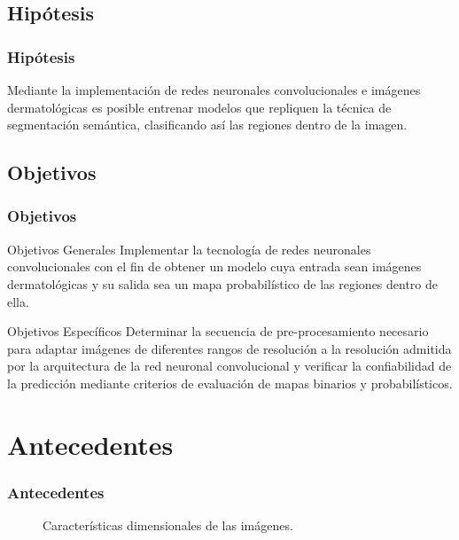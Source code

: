 \documentclass{beamer}
\begin{document}
\subsection{Hipótesis}
\begin{frame}
    \frametitle{Hipótesis}
    Mediante la implementación de redes neuronales convolucionales e imágenes dermatológicas es posible entrenar modelos que repliquen la técnica de segmentación semántica, clasificando así las regiones dentro de la imagen. 
\end{frame}

\subsection{Objetivos}
\begin{frame}
    \frametitle{Objetivos}
    \begin{block}{Objetivos Generales}
        Implementar la tecnología de redes neuronales convolucionales con el fin de obtener un modelo cuya entrada sean imágenes dermatológicas y su salida sea un mapa probabilístico de las regiones dentro de ella.
        
    \end{block}
    \begin{block}{Objetivos Específicos}
        Determinar la secuencia de pre-procesamiento necesario para adaptar imágenes de diferentes rangos de resolución a la resolución admitida por la arquitectura de la red neuronal convolucional y verificar la confiabilidad de la predicción mediante criterios de evaluación de mapas binarios y probabilísticos.
        
    \end{block}
\end{frame}

\section{Antecedentes}

\begin{frame}
\frametitle{Antecedentes}
    \begin{figure}
         \qquad
        \caption{Características dimensionales de las imágenes.}
    \end{figure}
\end{frame}
\end{document}
